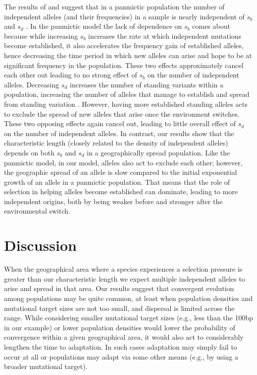 \documentclass{article}
\begin{document}
The results of \citet{softsweepsI} and \citet{softsweepsII} suggest that in a
panmictic population the number of independent alleles (and their frequencies) in a sample
is nearly independent of $s_b$ and $s_d$  \citep[although this
breaks down with fluctuating population size,
][]{Wilson-softsweep}. In the panmictic model the
lack of dependence on $s_b$ comes about because while increasing $s_b$
increases the rate at which independent mutations become established,
it also accelerates the frequency gain of established alleles, 
hence decreasing the time period in which new alleles can arise and hope to be at significant frequency in the population. 
These two effects approximately cancel each other out leading to no strong effect of $s_b$ on the number of independent alleles. 
Decreasing $s_d$ increases the number of standing variants within a population, 
increasing the number of alleles that manage to establish and spread from standing variation \citep{softsweepsI,Orr:01}. 
However, having more established standing alleles
acts to exclude the spread of new alleles that arise once the environment switches. 
These two opposing effects again cancel out, leading to little overall
effect of $s_d$ on the number of independent alleles.
In contrast, our results show that the characteristic length 
(closely related to the density of independent alleles) 
depends on both $s_b$ and $s_d$ in a geographically spread population. 
Like the panmictic model, in our model, alleles also act to exclude each other; 
however, the geographic spread of an allele is slow compared to the initial exponential growth of an allele in a panmictic population. 
That means that the role of selection in helping
alleles become established can dominate, leading to more independent origins, both by
being  weaker before and stronger after the environmental switch. 



\section{Discussion}

When the geographical area where a species experiences a 
selection pressure is greater than our characteristic
length we expect multiple independent alleles to arise and
spread in that area. Our results suggest that convergent evolution
among populations may be quite common, at least when population
densities and mutational target sizes are not too small, and dispersal is
limited across the range.  While considering smaller mutational
target sizes (e.g., less than the 100bp in our example) or lower population densities would lower the probability of convergence
within a given geographical area, it would also act to considerably lengthen
the time to adaptation. In such cases adaptation may simply fail to
occur at all or populations may adapt via some other means (e.g., by using a
broader mutational target). 
\end{document}
